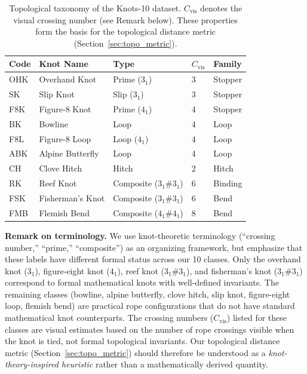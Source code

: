 \documentclass[preprint,review,12pt]{elsarticle}
\begin{document}
\begin{table}[t]
\centering
\caption{Topological taxonomy of the Knots-10 dataset. $C_{\text{vis}}$ denotes the visual crossing number (see Remark below). These properties form the basis for the topological distance metric (Section~\ref{sec:topo_metric}).}
\label{tab:knot_taxonomy}
\small
\begin{tabular}{@{}lllll@{}}
\toprule
Code & Knot Name & Type & $C_{\text{vis}}$ & Family \\
\midrule
OHK & Overhand Knot & Prime ($3_1$) & 3 & Stopper \\
SK  & Slip Knot & Slip ($3_1$) & 3 & Stopper \\
F8K & Figure-8 Knot & Prime ($4_1$) & 4 & Stopper \\
BK  & Bowline & Loop & 4 & Loop \\
F8L & Figure-8 Loop & Loop ($4_1$) & 4 & Loop \\
ABK & Alpine Butterfly & Loop & 4 & Loop \\
CH  & Clove Hitch & Hitch & 2 & Hitch \\
RK  & Reef Knot & Composite ($3_1 \# 3_1$) & 6 & Binding \\
FSK & Fisherman's Knot & Composite ($3_1 \# 3_1$) & 6 & Bend \\
FMB & Flemish Bend & Composite ($4_1 \# 4_1$) & 8 & Bend \\
\bottomrule
\end{tabular}
\end{table}

\noindent\textbf{Remark on terminology.} We use knot-theoretic terminology (``crossing number,'' ``prime,'' ``composite'') as an organizing framework, but emphasize that these labels have different formal status across our 10 classes. Only the overhand knot ($3_1$), figure-eight knot ($4_1$), reef knot ($3_1 \# 3_1$), and fisherman's knot ($3_1 \# 3_1$) correspond to formal mathematical knots with well-defined invariants. The remaining classes (bowline, alpine butterfly, clove hitch, slip knot, figure-eight loop, flemish bend) are practical rope configurations that do not have standard mathematical knot counterparts. The crossing numbers ($C_{\text{vis}}$) listed for these classes are visual estimates based on the number of rope crossings visible when the knot is tied, not formal topological invariants. Our topological distance metric (Section~\ref{sec:topo_metric}) should therefore be understood as a \emph{knot-theory-inspired heuristic} rather than a mathematically derived quantity.
\end{document}
